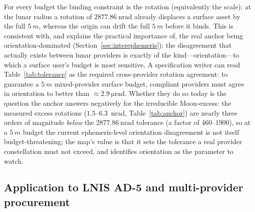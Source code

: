 For every budget the binding constraint is the rotation (equivalently the scale): at
the lunar radius a rotation of $\SI{2877.86}{\nano\radian}$ already displaces a
surface asset by the full $\SI{5}{m}$, whereas the origin can drift the full
$\SI{5}{m}$ before it binds. This is consistent with, and explains the practical
importance of, the real anchor being orientation-dominated
(Section~\ref{sec:interephemeris}): the disagreement that actually exists between
lunar providers is exactly of the kind---orientation---to which a surface user's
budget is most sensitive. A specification writer can read Table~\ref{tab:tolerance} as
the required cross-provider rotation agreement: to guarantee a $\SI{5}{m}$
mixed-provider surface budget, compliant providers must agree in orientation to
better than $\approx\!\SI{2.9}{\micro\radian}$. Whether they do so today is the
question the anchor answers negatively for the irreducible Moon-excess: the measured
excess rotations ($1.5$--$6.3$~nrad, Table~\ref{tab:anchor}) are nearly three orders of
magnitude \emph{below} the $\SI{2877.86}{\nano\radian}$ tolerance (a factor of
$460$--$1900$), so at a $\SI{5}{m}$ budget the current ephemeris-level orientation
disagreement is not itself budget-threatening; the map's value is that it sets the
tolerance a real provider constellation must not exceed, and identifies orientation as
the parameter to watch.

\subsection{Application to LNIS AD-5 and multi-provider procurement}
\label{sec:application}

